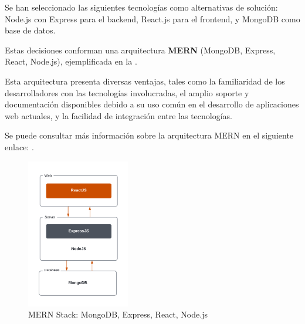 
Se han seleccionado las siguientes tecnologías como alternativas de solución: Node.js con Express para el backend, React.js para el frontend, y MongoDB como base 
de datos. 

Estas decisiones conforman una arquitectura \textbf{MERN} (MongoDB, Express, React, Node.js), ejemplificada en la . 

Esta arquitectura presenta diversas ventajas, tales como la familiaridad de los desarrolladores con las tecnologías involucradas, el amplio soporte y documentación disponibles debido a su uso común en el desarrollo de aplicaciones web actuales,
y la facilidad de integración entre las tecnologías.

Se puede consultar más información sobre la arquitectura MERN en el siguiente enlace: .

\begin{figure}[H]
    \centering
    \includegraphics[width=0.4\textwidth]{figures/4-Estudio-viabilidad/4_MERN2.png}
    \caption{MERN Stack: MongoDB, Express, React, Node.js}
    \label{fig:arquitectura_mern}
    \hypertarget{fig:arquitectura_mern}{}
\end{figure}
